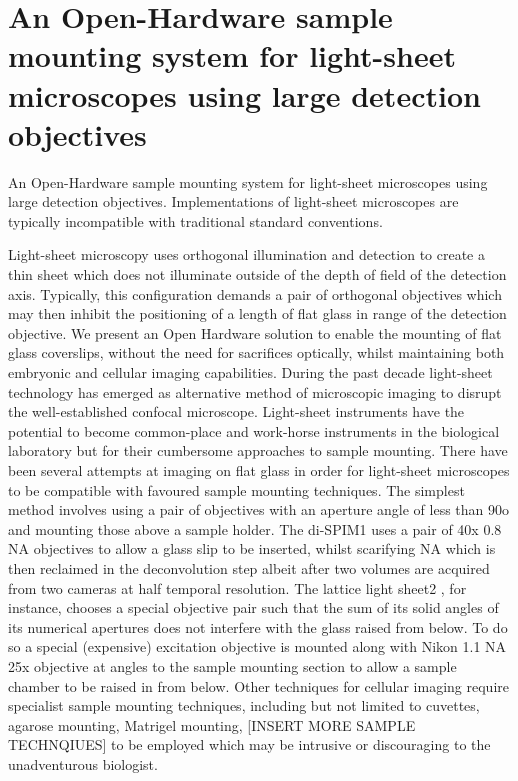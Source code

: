 \ifpdf
    \graphicspath{{Chapters/chamber/Figs/Raster/}{Chapters/chamber/Figs/PDF/}{Chapters/chamber/Figs/}}
\else
    \graphicspath{{Chapters/chamber/Figs/Vector/}{Chapters/chamber/Figs/}}
\fi


\chapter{An Open-Hardware sample mounting system for light-sheet microscopes using large detection objectives}\label{chapter:chamber}

An Open-Hardware sample mounting system for light-sheet microscopes using large detection objectives.
Implementations of light-sheet microscopes are typically incompatible with traditional standard conventions.

Light-sheet microscopy uses orthogonal illumination and detection to create a thin sheet which does not illuminate outside of the depth of field of the detection axis.
Typically, this configuration demands a pair of orthogonal objectives which may then inhibit the positioning of a length of flat glass in range of the detection objective.
We present an Open Hardware solution to enable the mounting of flat glass coverslips, without the need for sacrifices optically, whilst maintaining both embryonic and cellular imaging capabilities.
During the past decade light-sheet technology has emerged as alternative method of microscopic imaging to disrupt the well-established confocal microscope.
Light-sheet instruments have the potential to become common-place and work-horse instruments in the biological laboratory but for their cumbersome approaches to sample mounting.
There have been several attempts at imaging on flat glass in order for light-sheet microscopes to be compatible with favoured sample mounting techniques.
The simplest method involves using a pair of objectives with an aperture angle of less than 90o and mounting those above a sample holder.
The di-SPIM1 uses a pair of 40x 0.8 NA objectives to allow a glass slip to be inserted, whilst scarifying NA which is then reclaimed in the deconvolution step albeit after two volumes are acquired from two cameras at half temporal resolution.
The lattice light sheet2 , for instance, chooses a special objective pair such that the sum of its solid angles of its numerical apertures does not interfere with the glass raised from below.
To do so a special (expensive) excitation objective is mounted along with Nikon 1.1 NA 25x objective at angles to the sample mounting section to allow a sample chamber to be raised in from below.
Other techniques for cellular imaging require specialist sample mounting techniques, including but not limited to cuvettes, agarose mounting, Matrigel mounting, [INSERT MORE SAMPLE TECHNQIUES] to be employed which may be intrusive or discouraging to the unadventurous biologist.

